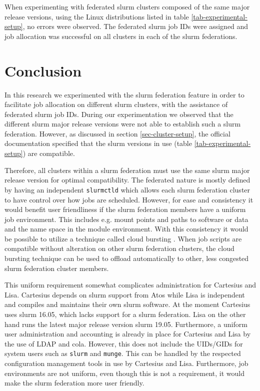\documentclass[conference]{IEEEtran}
\begin{document}
When experimenting with federated \gls{slurm} clusters composed of the same major release versions, using the Linux distributions listed in table \ref{tab-experimental-setup}, no errors were observed. The federated \gls{slurm} job IDs were assigned and job allocation was successful on all clusters in each of the \gls{slurm} federations.


\section{Conclusion}
In this research we experimented with the \gls{slurm} federation feature in order to facilitate job allocation on different \gls{slurm} clusters, with the assistance of federated \gls{slurm} job IDs. During our experimentation we observed that the different \gls{slurm} major release versions were not able to establish such a \gls{slurm} federation. However, as discussed in section \ref{sec-cluster-setup}, the official documentation specified that the \gls{slurm} versions in use (table \ref{tab-experimental-setup}) are compatible.

Therefore, all clusters within a \gls{slurm} federation must use the same \gls{slurm} major release version for optimal compatibility. The federated nature is mostly defined by having an independent \texttt{slurmctld} which allows each \gls{slurm} federation cluster to have control over how jobs are scheduled. However, for ease and consistency it would benefit user friendliness if the \gls{slurm} federation members have a uniform job environment. This includes e.g. mount points and paths to software or data and the name space in the module environment. With this consistency it would be possible to utilize a technique called cloud bursting \cite{slurm-cloud-bursting}. When job scripts are compatible without alteration on other \gls{slurm} federation clusters, the cloud bursting technique can be used to offload automatically to other, less congested \gls{slurm} federation cluster members.

This uniform requirement somewhat complicates administration for Cartesius and Lisa. Cartesius depends on \gls{slurm} support from Atos \cite{atos-website} while Lisa is independent and compiles and maintains their own \gls{slurm} software. At the moment Cartesius uses \gls{slurm} 16.05, which lacks support for a \gls{slurm} federation. Lisa on the other hand runs the latest major release version \gls{slurm} 19.05. Furthermore, a uniform user administration and accounting is already in place for Cartesius and Lisa by the use of LDAP and \gls{cola}. However, this does not include the UIDs/GIDs for system users such as \texttt{slurm} and \texttt{munge}. This can be handled by the respected configuration management tools in use by Cartesius and Lisa. Furthermore, job environments are not uniform, even though this is not a requirement, it would make the \gls{slurm} federation more user friendly.
\end{document}
